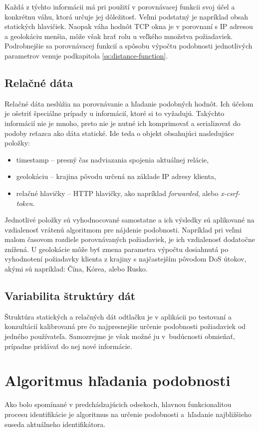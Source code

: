 \documentclass[
  printed, %
  table,   %
  lof,     %
  nolot,   %
  nocover
]{fithesis3}
\begin{document}
Každá z týchto informácii má pri použití v porovnávacej funkcii svoj účel a
konkrétnu váhu, ktorá určuje jej dôležitosť. Veľmi podstatný je napríklad obsah statických hlavičiek. Naopak
váha hodnôt TCP okna je v porovnaní s IP adresou a geolokáciu menšia, môže však
hrať rolu u veľkého množstva požiadaviek. Podrobnejšie sa porovnávacej funkcií a
spôsobu výpočtu podobnosti jednotlivých parametrov venuje podkapitola \ref{ss:distance-function}.

\subsection{Relačné dáta}
Relačné dáta neslúžia na porovnávanie a hľadanie podobných hodnôt. Ich účelom
je ošetriť špeciálne prípady u informácií, ktoré si to vyžadujú. Takýchto
informácií nie je mnoho, preto nie je nutné ich komprimovať a serializovať do podoby reťazca ako
dáta statické.
Ide teda o objekt obsahujúci nasledujúce položky:
\begin{itemize}
    \item timestamp -- presný čas nadviazania spojenia aktuálnej relácie,
    \item geolokáciu -- krajina pôvodu určená na základe IP adresy klienta,
    \item relačné hlavičky -- HTTP hlavičky, ako napríklad
    \textit{forwarded}, alebo \textit{x-csrf-token}. 
\end{itemize}

Jednotlivé položky sú vyhodnocované samostatne a ich výsledky sú aplikované na
vzdialenosť vrátenú algoritmom pre nájdenie podobnosti. Napríklad pri veľmi
malom časovom rozdiele porovnávaných požiadaviek, je ich vzdialenosť dodatočne
znížená. U geolokácie môže byť zmena parametra výpočtu dosiahnutá po vyhodnotení požiadavky
klienta z krajiny s najčastejším pôvodom DoS útokov, akými sú napríklad: Čína,
Kórea, alebo Rusko.

\subsection{Variabilita štruktúry dát}
Štruktúra statických a relačných dát odtlačku je v aplikácii po testovaní a konzultácií kalibrovaná
pre čo najpresnejšie určenie podobnosti požiadaviek od jedného používateľa.
Samozrejme je však možné ju v~budúcnosti obmieňať, prípadne pridávať do nej
nové informácie.

\section{Algoritmus hľadania podobnosti}
\label{s:similarity-search}
Ako bolo spomínané v predchádzajúcich odsekoch, hlavnou funkcionalitou procesu identifikácie je
algoritmus na určenie podobnosti a~hľadanie najbližšieho suseda aktuálneho
identifikátora. 
\end{document}
